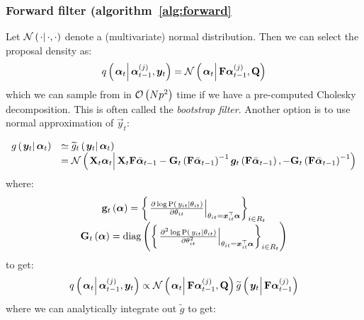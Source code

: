 \subsubsection*{Forward filter (algorithm~\ref{alg:forward}}
Let $\normalC{\cdot}{\cdot}{\cdot}$ denote a (multivariate) normal distribution. Then we can select the proposal density as:
\begin{equation}
	\IDC{\vec{\alpha}_t}{\partic{\vec{\alpha}}{t-1}{j}, \vec{y}_t} = %
		\normalC{\vec{\alpha}_t}{\mat{F}\partic{\vec{\alpha}}{t-1}{j}}{\mat{Q}}
\end{equation}%
%
which we can sample from in $\mathcal{O}\left( Np^2\right)$ time if we have a pre-computed Cholesky decomposition. This is often called the \emph{bootstrap filter}. Another option is to use normal approximation of $\vec{y}_t$:

\begin{equation}\begin{array}{cl}
	\optorC{g}{\vec{y}_t}{\vec{\alpha}_t} & \simeq  \optorC{\widetilde{g}_t}{\vec{y}_t}{\vec{\alpha}_t} \\ &= %
		\normalC{
			\mat{X}_t\vec{\alpha}_t
		}{ %
			\mat{X}_t\mat{F}\vecb{\alpha}_{t - 1} - 
			\mat{G}_t\Lparen{\mat{F}\vecb{\alpha}_{t - 1}}^{-1}
			\vec{g}_t\Lparen{\mat{F}\vecb{\alpha}_{t - 1}}
		}{ %
			- \mat{G}_t\Lparen{\mat{F}\vecb{\alpha}_{t - 1}}^{-1}
		}
\end{array}\end{equation}
%
% 
where:
\begin{equation}\begin{array}{c}
\mat{g}_t\Lparen{\vec{\alpha}} = 
		\Lbrace{\left.\frac{
		\partial \log \propC{y_{it}}{\theta_{it}}
	}{
		\partial\theta_{it}
	}\right|_{\theta_{it} = \vec{x}_{it}^\top\vec{\alpha}} }_{i \in R_t} \\
%
	\mat{G}_t\Lparen{\vec{\alpha}} = 
		\diag{\Lbrace{\left.\frac{
		\partial^2 \log \propC{y_{it}}{\theta_{it}}
	}{
		\partial\theta_{it}^2
	}\right|_{\theta_{it} = \vec{x}_{it}^\top\vec{\alpha}} }_{i \in R_t}}
\end{array}\end{equation}
%
%
to get:
\begin{equation}
	\IDC{\vec{\alpha}_t}{\partic{\vec{\alpha}}{t-1}{j}, \vec{y}_t} \propto %
		\normalC{\vec{\alpha}_t}{\mat{F}\partic{\vec{\alpha}}{t-1}{j}}{\mat{Q}}
		\optorC{\widetilde{g}}{\vec{y}_t}{\mat{F}\partic{\vec{\alpha}}{t-1}{j}}
\end{equation}
%
%
where we can analytically integrate out $\widetilde{g}$ to get:
